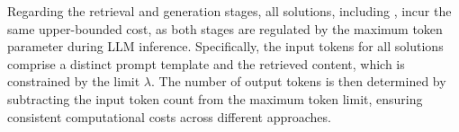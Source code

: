 Regarding the retrieval and generation stages, all solutions, including \sketrag, incur the same upper-bounded cost, as both stages are regulated by the maximum token parameter during LLM inference. Specifically, the input tokens for all solutions comprise a distinct prompt template and the retrieved content, which is constrained by the limit $\lambda$. The number of output tokens is then determined by subtracting the input token count from the maximum token limit, ensuring consistent computational costs across different approaches.


